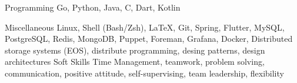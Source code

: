 

\begin{cvskills}

  \cvskill
    {Programming} %
    {Go, Python, Java, C, Dart, Kotlin} %

  \cvskill
    {Miscellaneous} %
    {Linux, Shell (Bash/Zsh), \LaTeX, Git, Spring, Flutter, MySQL, PostgreSQL, Redis, MongoDB, Puppet, Foreman, Grafana, Docker, Distributed storage systems (EOS), distribute programming, desing patterns, design architectures} %
  \cvskill
    {Soft Skills} %
    {Time Management, teamwork, problem solving, communication, positive attitude, self-supervising, team leadership, flexibility} %

\end{cvskills}
